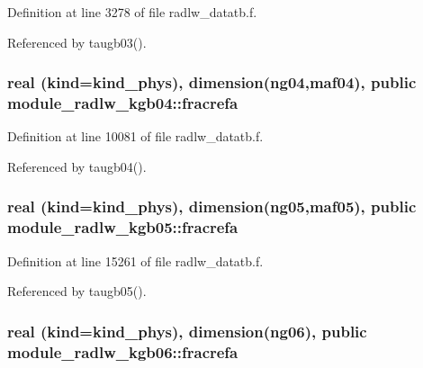 Definition at line 3278 of file radlw\+\_\+datatb.\+f.



Referenced by taugb03().

\subsubsection[{\texorpdfstring{fracrefa}{fracrefa}}]{\setlength{\rightskip}{0pt plus 5cm}real (kind=kind\+\_\+phys), dimension(ng04,maf04), public module\+\_\+radlw\+\_\+kgb04\+::fracrefa}\hypertarget{group__module__radlw__main_gace1d87742e2c543d9b0662e1c7d2b624}{}\label{group__module__radlw__main_gace1d87742e2c543d9b0662e1c7d2b624}


Definition at line 10081 of file radlw\+\_\+datatb.\+f.



Referenced by taugb04().

\subsubsection[{\texorpdfstring{fracrefa}{fracrefa}}]{\setlength{\rightskip}{0pt plus 5cm}real (kind=kind\+\_\+phys), dimension(ng05,maf05), public module\+\_\+radlw\+\_\+kgb05\+::fracrefa}\hypertarget{group__module__radlw__main_ga335fd60e59154f47724d2e25fdf0a5fb}{}\label{group__module__radlw__main_ga335fd60e59154f47724d2e25fdf0a5fb}


Definition at line 15261 of file radlw\+\_\+datatb.\+f.



Referenced by taugb05().

\subsubsection[{\texorpdfstring{fracrefa}{fracrefa}}]{\setlength{\rightskip}{0pt plus 5cm}real (kind=kind\+\_\+phys), dimension(ng06), public module\+\_\+radlw\+\_\+kgb06\+::fracrefa}\hypertarget{group__module__radlw__main_ga1354ecbc5f07cd763847333e680c686a}{}\label{group__module__radlw__main_ga1354ecbc5f07cd763847333e680c686a}


